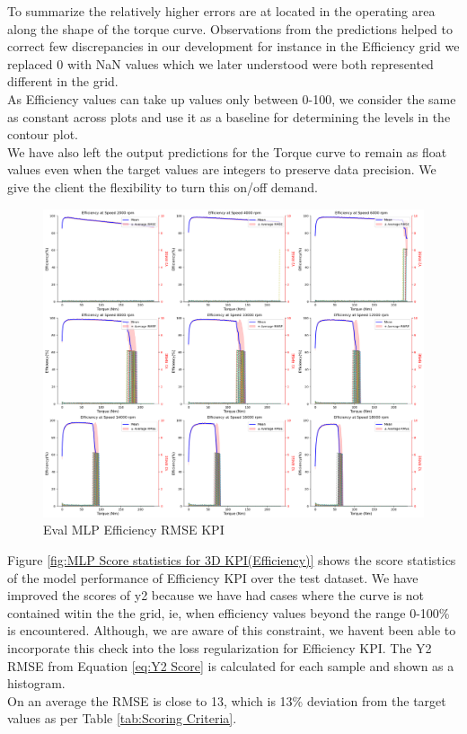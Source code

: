 \documentclass{report} %
\begin{document}
To summarize the relatively higher errors are at located in the operating area along the shape of the torque curve.
Observations from the predictions helped to correct few discrepancies in our development for instance in the Efficiency grid we replaced 0 with \ac{NaN} values which we later understood were both represented different in the grid.\\
As Efficiency values can take up values only between 0-100, we consider the same as constant across plots and use it as a baseline for determining the levels in the contour plot. \\ 
We have also left the output predictions for the Torque curve to remain as float values even when the target values are integers to preserve data precision. We give the client the flexibility to turn this on/off demand. \\

\begin{figure}[H]
    \centering
    \includegraphics[width=1\textwidth]{./ReportImages/rmse_eta_MLP.png} 
    \caption{Eval MLP Efficiency \ac{RMSE} \ac{KPI}} 
    \label{fig:Eval MLP Efficiency RMSE KPI}
\end{figure}

Figure \ref{fig:MLP Score statistics for 3D KPI(Efficiency)} shows the score statistics of the model performance of Efficiency \ac{KPI} over the test dataset.
We have improved the scores of y2 because we have had cases where the curve is not contained witin the the grid, ie, when efficiency values beyond the range 0-100\% is encountered.
Although, we are aware of this constraint, we havent been able to incorporate this check into the loss regularization for Efficiency \ac{KPI}.
The Y2 \ac{RMSE} from Equation \ref{eq:Y2 Score} is calculated for each sample and shown as a histogram.\\
On an average the \ac{RMSE} is close to 13, which is 13\% deviation from the target values as per Table \ref{tab:Scoring Criteria}.\\
\end{document}
